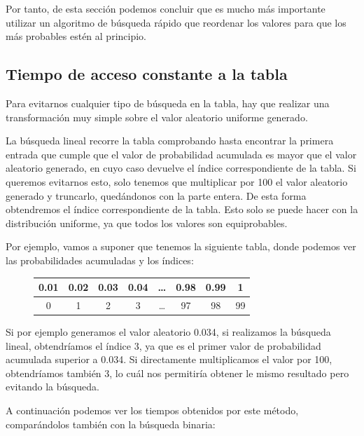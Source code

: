\documentclass[11pt,a4paper]{report}
\begin{document}
Por tanto, de esta sección podemos concluir que es mucho más importante utilizar un algoritmo de búsqueda rápido que reordenar
los valores para que los más probables estén al principio.

\subsection{Tiempo de acceso constante a la tabla}

Para evitarnos cualquier tipo de búsqueda en la tabla, hay que realizar una transformación muy simple sobre el valor aleatorio
uniforme generado.

La búsqueda lineal recorre la tabla comprobando hasta encontrar la primera entrada que cumple que el valor de probabilidad
acumulada es mayor que el valor aleatorio generado, en cuyo caso devuelve el índice correspondiente de la tabla. Si queremos
evitarnos esto, solo tenemos que multiplicar por 100 el valor aleatorio generado y truncarlo, quedándonos con la parte
entera. De esta forma obtendremos el índice correspondiente de la tabla. Esto solo se puede hacer con la distribución uniforme,
ya que todos los valores son equiprobables.

Por ejemplo, vamos a suponer que tenemos la siguiente tabla, donde podemos ver las probabilidades acumuladas y los índices:

\begin{figure}[H]
\centering
\begin{tabular}{|c|c|c|c|c|c|c|c|}
	\hline
    0.01 & 0.02 & 0.03 & 0.04 & \dots & 0.98 & 0.99 & 1 \\ \hline
    \multicolumn{1}{c}{0} & \multicolumn{1}{c}{1} & \multicolumn{1}{c}{2} & \multicolumn{1}{c}{3} & \multicolumn{1}{c}{\dots} &
    \multicolumn{1}{c}{97} & \multicolumn{1}{c}{98} & \multicolumn{1}{c}{99}
\end{tabular}
\end{figure}

Si por ejemplo generamos el valor aleatorio 0.034, si realizamos la búsqueda lineal, obtendríamos el índice 3, ya que es el primer
valor de probabilidad acumulada superior a 0.034. Si directamente multiplicamos el valor por 100, obtendríamos también
3, lo cuál nos permitiría obtener le mismo resultado pero evitando la búsqueda.

A continuación podemos ver los tiempos obtenidos por este método, comparándolos también con la búsqueda binaria:
\end{document}
